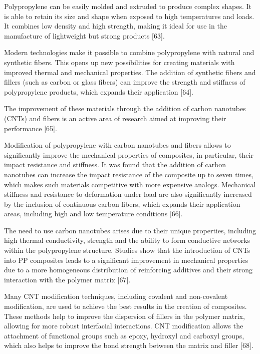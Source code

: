Polypropylene can be easily molded and extruded to produce complex
shapes. It is able to retain its size and shape when exposed to high
temperatures and loads. It combines low density and high strength,
making it ideal for use in the manufacture of lightweight but strong
products {[}63{]}.

Modern technologies make it possible to combine polypropylene with
natural and synthetic fibers. This opens up new possibilities for
creating materials with improved thermal and mechanical properties. The
addition of synthetic fibers and fillers (such as carbon or glass
fibers) can improve the strength and stiffness of polypropylene
products, which expands their application {[}64{]}.

The improvement of these materials through the addition of carbon
nanotubes (CNTs) and fibers is an active area of research aimed at
improving their performance {[}65{]}.

Modification of polypropylene with carbon nanotubes and fibers allows to
significantly improve the mechanical properties of composites, in
particular, their impact resistance and stiffness. It was found that the
addition of carbon nanotubes can increase the impact resistance of the
composite up to seven times, which makes such materials competitive with
more expensive analogs. Mechanical stiffness and resistance to
deformation under load are also significantly increased by the inclusion
of continuous carbon fibers, which expands their application areas,
including high and low temperature conditions {[}66{]}.

The need to use carbon nanotubes arises due to their unique properties,
including high thermal conductivity, strength and the ability to form
conductive networks within the polypropylene structure. Studies show
that the introduction of CNTs into PP composites leads to a significant
improvement in mechanical properties due to a more homogeneous
distribution of reinforcing additives and their strong interaction with
the polymer matrix {[}67{]}.

Many CNT modification techniques, including covalent and non-covalent
modification, are used to achieve the best results in the creation of
composites. These methods help to improve the dispersion of fillers in
the polymer matrix, allowing for more robust interfacial interactions.
CNT modification allows the attachment of functional groups such as
epoxy, hydroxyl and carboxyl groups, which also helps to improve the
bond strength between the matrix and filler {[}68{]}.

